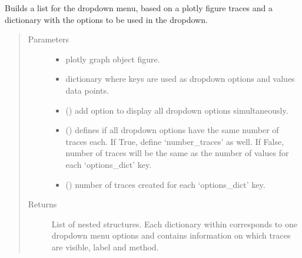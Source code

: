 \documentclass[letterpaper,10pt,english]{sphinxmanual}
\begin{document}
\begin{fulllineitems}
\label{\detokenize{_autosummary/report_manager.apps:report_manager.apps.imports.get_dropdown_menu}}
Builds a list for the dropdown menu, based on a plotly figure traces and a dictionary with     the options to be used in the dropdown.
\begin{quote}\begin{description}
\item[{Parameters}] \leavevmode\begin{itemize}
\item {} 
 \textendash{} plotly graph object figure.

\item {} 
 \textendash{} dictionary where keys are used as dropdown options and values data points.

\item {} 
 () \textendash{} add option to display all dropdown options simultaneously.

\item {} 
 () \textendash{} defines if all dropdown options have the same number of traces each.                                 If True, define ‘number\_traces’ as well. If False, number of traces                                 will be the same as the number of values for each ‘options\_dict’ key.

\item {} 
 () \textendash{} number of traces created for each ‘options\_dict’ key.

\end{itemize}

\item[{Returns}] \leavevmode
List of nested structures. Each dictionary within  corresponds             to one dropdown menu options and contains information on which traces are visible, label and method.

\end{description}\end{quote}

\end{fulllineitems}
\end{document}
